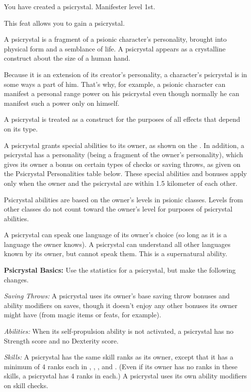 {You have created a psicrystal.}
{Manifester level 1st.}
{This feat allows you to gain a psicrystal.

A psicrystal is a fragment of a psionic character's personality, brought into physical form and a semblance of life. A psicrystal appears as a crystalline construct about the size of a human hand.

Because it is an extension of its creator's personality, a character's psicrystal is in some ways a part of him. That's why, for example, a psionic character can manifest a personal range power on his psicrystal even though normally he can manifest such a power only on himself.

A psicrystal is treated as a construct for the purposes of all effects that depend on its type.

A psicrystal grants special abilities to its owner, as shown on the . In addition, a psicrystal has a personality (being a fragment of the owner's personality), which gives its owner a bonus on certain types of checks or saving throws, as given on the Psicrystal Personalities table below. These special abilities and bonuses apply only when the owner and the psicrystal are within 1.5 kilometer of each other.

Psicrystal abilities are based on the owner's levels in psionic classes. Levels from other classes do not count toward the owner's level for purposes of psicrystal abilities.

A psicrystal can speak one language of its owner's choice (so long as it is a language the owner knows). A psicrystal can understand all other languages known by its owner, but cannot speak them. This is a supernatural ability.

\textbf{Psicrystal Basics:} Use the statistics for a psicrystal, but make the following changes.

\textit{Saving Throws:} A psicrystal uses its owner's base saving throw bonuses and ability modifiers on saves, though it doesn't enjoy any other bonuses its owner might have (from magic items or feats, for example).

\textit{Abilities:} When its self-propulsion ability is not activated, a psicrystal has no Strength score and no Dexterity score.

\textit{Skills:} A psicrystal has the same skill ranks as its owner, except that it has a minimum of 4 ranks each in , , , and . (Even if its owner has no ranks in these skills, a psicrystal has 4 ranks in each.) A psicrystal uses its own ability modifiers on skill checks.

}
